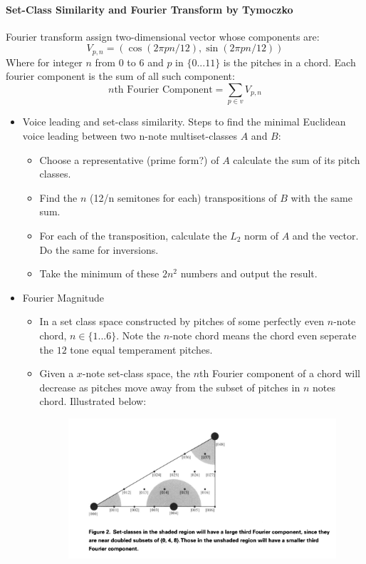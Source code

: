 \paragraph*{Set-Class Similarity and Fourier Transform by Tymoczko}
Fourier transform assign two-dimensional vector whose components are:
\[V_{p,n}=(\cos(2\pi pn/12), \sin(2\pi pn/12))\]
Where for integer $n$ from $0$ to $6$ and $p$ in $\{0...11\}$ is the pitches
in a chord. Each fourier component is the sum of all such component:
\[n\text{th Fourier Component}=\sum_{p\in v}V_{p,n}\]
\begin{itemize}
    \item Voice leading and set-class similarity. Steps
    to find the minimal Euclidean voice leading between two n-note 
    multiset-classes $A$ and $B$:
        \begin{itemize}
            \item Choose a representative (prime form?) of $A$ calculate 
            the sum of its pitch classes.
            \item Find the $n$ (12/n semitones for each) 
            transpositions of $B$ with the same sum.
            \item For each of the transposition, calculate the $L_2$
            norm of $A$ and the vector. Do the same for inversions.
            \item Take the minimum of these $2n^2$ numbers and output the 
            result.
        \end{itemize}
    \item Fourier Magnitude
        \begin{itemize}
            \item In a set class space constructed by pitches of some 
            perfectly even $n$-note chord, $n\in\{1...6\}$. Note the $n$-note
            chord means the chord even seperate the $12$ tone equal 
            temperament pitches. 
            \item Given a $x$-note set-class space, the $n$th Fourier component of a chord will decrease 
            as pitches move away from the subset of pitches in $n$ notes 
            chord. Illustrated below:
            \begin{figure}[h]
                \includegraphics[scale=0.5]{Tymoczko_1.png}

\end{figure}
\end{itemize}
\end{itemize}
